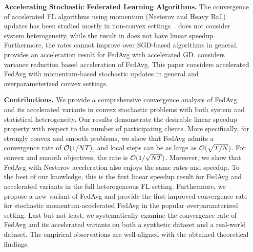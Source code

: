 \textbf{Accelerating Stochastic Federated Learning Algorithms.}
The convergence of accelerated FL algorithms using momentum (Nesterov and Heavy Ball) updates has been studied mostly in non-convex settings~\cite{yu2019linear,huo2020faster}. \cite{yu2019linear} does not consider system heterogeneity, while the result in \cite{huo2020faster} does not have linear speedup. Furthermore, the rates cannot improve over SGD-based algorithms in general. \cite{liu2019accelerating} provides an acceleration result for FedAvg with accelerated GD. \cite{liang2019variance} considers variance reduction based acceleration of FedAvg. This paper considers accelerated FedAvg with momentum-based stochastic updates in general and overparameterized convex settings.

\begin{comment}
	In this work, we provide a novel accelerated FedAvg with improved convergence rates under a popular overparameterized setting. 
\end{comment}








\textbf{Contributions.}
We provide a comprehensive convergence analysis
of FedAvg and its accelerated variants in convex stochastic problems with both system and statistical heterogeneity.
Our results demonstrate the desirable linear speedup property with respect to the number of participating clients.
More specifically, for strongly convex and smooth problems, we show 
that FedAvg admits a convergence rate of 
{\small{${\mathcal{O}}(1/NT)$}}, and local steps can be as large as {\small{${\mathcal{O}}(\sqrt{T/N})$}}. For convex and smooth objectives, the rate is {\small{${\mathcal{O}}(1/\sqrt{NT})$}}. 
Moreover, we show that FedAvg with Nesterov acceleration also enjoys the same rates and speedup. 
To the best of our knowledge, this is the first linear speedup result for FedAvg and accelerated variants in the full heterogeneous FL setting. Furthermore, 
we propose a new variant of FedAvg and provide the first improved convergence rate for stochastic momentum-accelerated FedAvg in the popular overparamterized setting.
Last but not least, we systematically examine the convergence rate of
FedAvg and its accelerated variants on both a synthetic dataset and  a real-world dataset. The empirical observations are well-aligned with the obtained theoretical findings.

